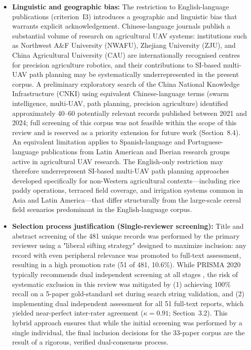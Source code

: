 \documentclass[review,3p,times]{elsarticle}
\begin{document}
\begin{itemize}
{\begin{itemize}
  \item \textbf{Linguistic and geographic bias:} The restriction to English-language publications (criterion~I3) introduces a geographic and linguistic bias that warrants explicit acknowledgement. Chinese-language journals publish a substantial volume of research on agricultural UAV systems: institutions such as Northwest A\&F University (NWAFU), Zhejiang University (ZJU), and China Agricultural University (CAU) are internationally recognised centres for precision agriculture robotics, and their contributions to SI-based multi-UAV path planning may be systematically underrepresented in the present corpus. A preliminary exploratory search of the China National Knowledge Infrastructure (CNKI) using equivalent Chinese-language terms (swarm intelligence, multi-UAV, path planning, precision agriculture) identified approximately 40--60 potentially relevant records published between 2021 and 2024; full screening of this corpus was not feasible within the scope of this review and is reserved as a priority extension for future work (Section~8.4). An equivalent limitation applies to Spanish-language and Portuguese-language publications from Latin American and Iberian research groups active in agricultural UAV research. The English-only restriction may therefore underrepresent SI-based multi-UAV path planning approaches developed specifically for non-Western agricultural contexts---including rice paddy operations, terraced field coverage, and irrigation systems common in Asia and Latin America---that differ structurally from the large-scale cereal field scenarios predominant in the English-language corpus.
  \item \textbf{Selection process justification (Single-reviewer screening):} Title and abstract screening of the 481 unique records was performed by the primary reviewer using a "liberal sifting strategy" designed to maximize inclusion: any record with even peripheral relevance was promoted to full-text assessment, resulting in a high promotion rate (51 of 481, 10.6\%). While PRISMA 2020 typically recommends dual independent screening at all stages \cite{page2021}, the risk of systematic exclusion in this review was mitigated by (1) achieving 100\% recall on a 5-paper gold-standard set during search string validation, and (2) implementing dual independent assessment for all 51 full-text reports, which yielded near-perfect inter-rater agreement ($\kappa=0.91$; Section~3.2). This hybrid approach ensures that while the initial screening was performed by a single individual, the final inclusion decisions for the 33-paper corpus are the result of a rigorous, verified dual-consensus process.

\end{itemize}}
\end{itemize}
\end{document}
